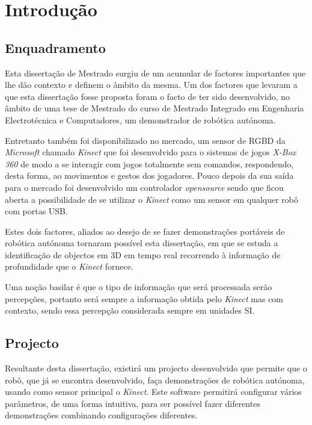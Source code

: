 \chapter{Introdução} \label{chap:intro}

\section{Enquadramento} \label{sec:context}

Esta dissertação de Mestrado surgiu de um acumular de factores importantes que lhe dão 
contexto e definem o âmbito da mesma.
Um dos factores que levaram a que esta dissertação fosse proposta foram o facto de ter sido
desenvolvido, no âmbito de uma tese de Mestrado do curso de Mestrado Integrado em
Engenharia Electrotécnica e Computadores, um demonstrador de robótica autónoma. 

Entretanto também foi disponibilizado no mercado, um sensor de RGBD da \emph{Microsoft} chamado 
\emph{Kinect} que foi desenvolvido para o sistemas de jogos \emph{X-Box 360} de modo a
se interagir com jogos totalmente sem comandos, respondendo, desta forma, ao movimentos e gestos
dos jogadores. Pouco depois da sua saída para o mercado foi desenvolvido um controlador \emph{opensource}
sendo que ficou aberta a possibilidade de se utilizar o \emph{Kinect} como um sensor em qualquer
robô com portas USB.

Estes dois factores, aliados ao desejo de se fazer demonstrações portáveis de robótica autónoma 
tornaram possível esta dissertação, em que se estuda a identificação de objectos em 3D 
em tempo real recorrendo à informação de profundidade que o \emph{Kinect} fornece.

Uma noção basilar é que o tipo de informação que será processada serão percepções, portanto
será sempre a informação obtida pelo \emph{Kinect} mas com contexto, sendo essa percepção
considerada sempre em unidades SI.

\section{Projecto} \label{sec:proj}

Resultante desta dissertação, existirá um projecto desenvolvido que permite que o robô,
que já se encontra desenvolvido, faça demonstrações de robótica autónoma, usando como sensor
principal o \emph{Kinect}. Este software permitirá configurar vários parâmetros, 
de uma forma intuitiva, para ser possível fazer diferentes demonstrações combinando
configurações diferentes.

